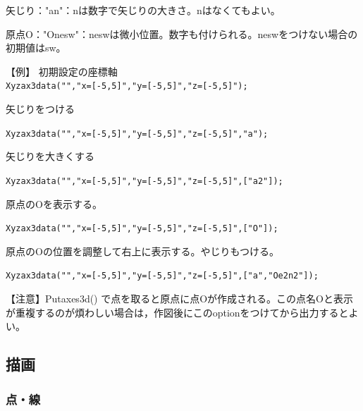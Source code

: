 \documentclass[papersize,a4paper,12pt,uplatex]{jsarticle}
\begin{document}
\begin{description}
矢じり："an"：nは数字で矢じりの大きさ。nはなくてもよい。

原点O："Onesw"：neswは微小位置。数字も付けられる。neswをつけない場合の初期値はsw。

【例】 初期設定の座標軸\\
\verb|Xyzax3data("","x=[-5,5]","y=[-5,5]","z=[-5,5]");|

 矢じりをつける
 
 \verb|Xyzax3data("","x=[-5,5]","y=[-5,5]","z=[-5,5]","a");|
 
 矢じりを大きくする
 
 \verb|Xyzax3data("","x=[-5,5]","y=[-5,5]","z=[-5,5]",["a2"]);|

原点のOを表示する。

 \verb|Xyzax3data("","x=[-5,5]","y=[-5,5]","z=[-5,5]",["O"]);|
 
 原点のOの位置を調整して右上に表示する。やじりもつける。
 
 \verb|Xyzax3data("","x=[-5,5]","y=[-5,5]","z=[-5,5]",["a","Oe2n2"]);|
 

【注意】Putaxes3d() で点を取ると原点に点Oが作成される。この点名Oと表示が重複するのが煩わしい場合は，作図後にこのoptionをつけてから出力するとよい。

\end{description}

\subsection{描画}

\subsubsection{点・線}
\end{document}
